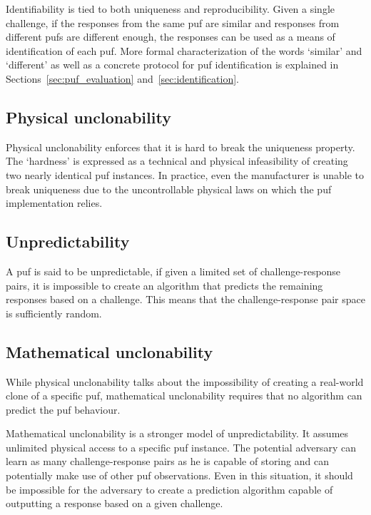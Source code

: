 Identifiability is tied to both uniqueness and reproducibility. Given a single challenge, if the responses from the same \gls{puf} are similar and responses from different \glspl{puf} are different enough, the responses can be used as a means of identification of each \gls{puf}. More formal characterization of the words `similar' and `different' as well as a concrete protocol for \gls{puf} identification is explained in Sections~\ref{sec:puf_evaluation} and~\ref{sec:identification}.

\subsection*{Physical unclonability}
 
Physical unclonability enforces that it is hard to break the uniqueness property. The `hardness' is expressed as a technical and physical infeasibility of creating two nearly identical \gls{puf} instances. In practice, even the manufacturer is unable to break uniqueness due to the uncontrollable physical laws on which the \gls{puf} implementation relies.

\subsection*{Unpredictability}

A \gls{puf} is said to be unpredictable, if given a limited set of challenge-response pairs, it is impossible to create an algorithm that predicts the remaining responses based on a challenge. This means that the challenge-response pair space is sufficiently random.

\subsection*{Mathematical unclonability}

While physical unclonability talks about the impossibility of creating a real-world clone of a specific \gls{puf}, mathematical unclonability requires that no algorithm can predict the \gls{puf} behaviour.

Mathematical unclonability is a stronger model of unpredictability. It assumes unlimited physical access to a specific \gls{puf} instance. The potential adversary can learn as many challenge-response pairs as he is capable of storing and can potentially make use of other \gls{puf} observations. Even in this situation, it should be impossible for the adversary to create a prediction algorithm capable of outputting a response based on a given challenge. 


